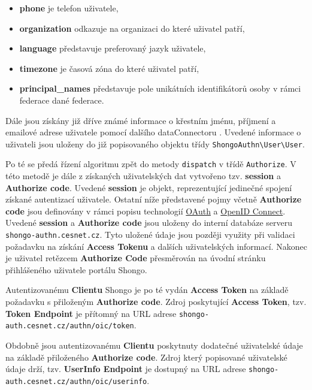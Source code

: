\documentclass[
  printed, %
  twoside, %
  table,   %
  nolof,     %
  nolot,     %
]{fithesis3}
\begin{document}
\begin{itemize}
    \item \textbf{phone} je telefon uživatele,
    \item \textbf{organization} odkazuje na organizaci do které uživatel patří,
    \item \textbf{language} představuje preferovaný jazyk uživatele,
    \item \textbf{timezone} je časová zóna do které uživatel patří, 
    \item \textbf{principal\_names} představuje pole unikátních identifikátorů osoby v rámci federace dané federace. 
\end{itemize}
Dále jsou získány již dříve známé informace o křestním jménu, příjmení a emailové adrese uživatele pomocí dalšího dataConnectoru . Uvedené informace o uživateli jsou uloženy do již popisovaného objektu třídy \texttt{ShongoAuthn\textbackslash User\textbackslash User}. \par

Po té se předá řízení algoritmu zpět do metody \texttt{dispatch} v třídě \texttt{Authorize}. V této metodě je dále z získaných uživatelských dat vytvořeno tzv. \textbf{session} a \textbf{Authorize code}. Uvedené \textbf{session} je objekt, reprezentující jedinečné spojení získané autentizací uživatele. Ostatní níže představené pojmy včetně \textbf{Authorize code} jsou definovány v rámci popisu technologií \hyperref[sec:oauth]{OAuth} a \hyperref[sec:oidc]{OpenID Connect}. Uvedené \textbf{session} a \textbf{Authorize code} jsou uloženy do interní databáze serveru \texttt{shongo-authn.cesnet.cz}. Tyto uložené údaje jsou později využity při validaci požadavku na získání \textbf{Access Tokenu} a dalších uživatelských informací. Nakonec je uživatel retězcem \textbf{Authorize Code} přesměrován na úvodní stránku přihlášeného uživatele portálu Shongo. \par

Autentizovanému \textbf{Clientu} Shongo je po té vydán  \textbf{Access Token} na základě požadavku s přiloženým \textbf{Authorize code}.   
Zdroj poskytující \textbf{Access Token}, tzv. \textbf{Token Endpoint} je přítomný na URL adrese \texttt{shongo-auth.cesnet.cz/authn/oic/token}. \par 

Obdobně jsou autentizovanému \textbf{Clientu} poskytnuty dodatečné uživatelské údaje na základě přiloženého \textbf{Authorize code}. Zdroj který popisované uživatelské údaje drží, tzv. \textbf{UserInfo Endpoint} je dostupný na URL adrese \texttt{shongo-auth.cesnet.cz/authn/oic/userinfo}.  \par 
\end{document}
